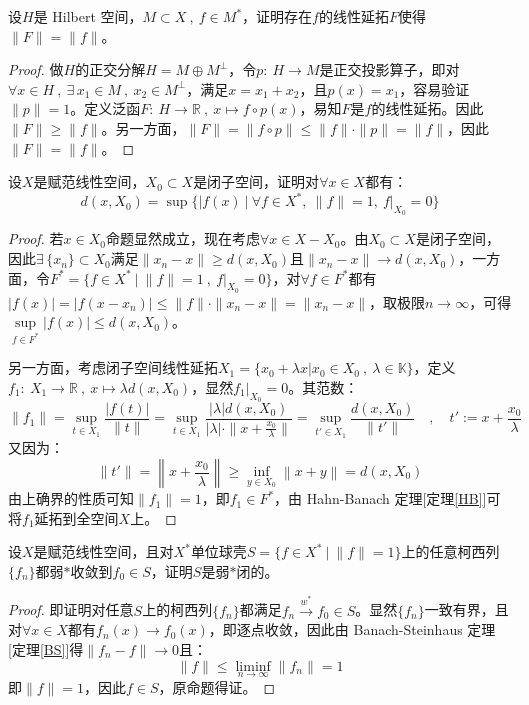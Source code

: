 \begin{example}
\quad 设$H$是 Hilbert 空间，$M \subset X \ , \ f \in M^*$，证明存在$f$的线性延拓$F$使得$\|F\|=\|f\|$。
\end{example}
\begin{proof}
做$H$的正交分解$H=M \oplus M^{\perp}$，令$p: \ H \to M$是正交投影算子，即对$\forall x \in H \ , \ \exists \, x_1 \in M \ , \ x_2 \in M^{\perp}$，满足$x=x_1+x_2$，且$p(x)=x_1$，容易验证$\|p\|=1$。定义泛函$F: \ H \to \mathbb{R} \ , \ x \mapsto f \circ p(x)$，易知$F$是$f$的线性延拓。因此$\|F\|\geq\|f\|$。另一方面，$\|F\|=\|f \circ p\| \leq \|f\| \cdot \|p\|=\|f\|$，因此$\|F\|=\|f\|$。
\end{proof}

\begin{example}
\quad 设$X$是赋范线性空间，$X_0 \subset X$是闭子空间，证明对$\forall x \in X$都有：
\[d(x,X_0)=\sup\{|f(x) \ | \ \forall f \in X^*, \ \|f\|=1, \ f|_{X_0}=0\}\]
\end{example}
\begin{proof}
若$x \in X_0$命题显然成立，现在考虑$\forall x \in X-X_0$。由$X_0 \subset X$是闭子空间，因此$\exists \, \{x_n\} \subset X_0$满足$\|x_n-x\| \geq d(x,X_0)$且$\|x_n-x\| \to d(x,X_0)$，一方面，令$F^*=\{f \in X^* \ | \ \|f\|=1 \ , \ f|_{X_0}=0\}$，对$\forall f \in F^*$都有$|f(x)|=|f(x-x_n)|\leq\|f\|\cdot\|x_n-x\|=\|x_n-x\|$，取极限$n \to \infty$，可得$\sup\limits_{f \in F^*}|f(x)|\leq d(x,X_0)$。

另一方面，考虑闭子空间线性延拓$X_1=\{x_0+\lambda x|x_0 \in X_0 \ , \ \lambda \in \mathbb{K}\}$，定义$f_1: \ X_1 \to \mathbb{R} \ , \ x \mapsto \lambda d(x,X_0)$，显然$f_1|_{X_0}=0$。其范数：
 \[\|f_1\|=\sup_{t \in X_1}\frac{|f(t)|}{\|t\|}=\sup_{t \in X_1}\frac{|\lambda|d(x,X_0)}{|\lambda|\cdot\|x+\frac{x_0}{\lambda}\|}=\sup_{t' \in X_1}\frac{d(x,X_0)}{\|t'\|} \quad , \quad t':=x+\frac{x_0}{\lambda}\]
 又因为：
 \[\|t'\|=\left\|x+\frac{x_0}{\lambda}\right\|\geq\inf_{y \in X_0}\left\|x+y\right\|=d(x,X_0)\]
 由上确界的性质可知$\|f_1\|=1$，即$f_1 \in F^*$，由 Hahn-Banach 定理[定理\ref{HB}]可将$f_1$延拓到全空间$X$上。
\end{proof}

\begin{example}
\quad 设$X$是赋范线性空间，且对$X^*$单位球壳$S=\{f \in X^* \ | \ \|f\|=1\}$上的任意柯西列$\{f_n\}$都弱$*$收敛到$f_0 \in S$，证明$S$是弱$*$闭的。
\end{example}
\begin{proof}
即证明对任意$S$上的柯西列$\{f_n\}$都满足$f_n \xrightarrow{w^*} f_0 \in S$。显然$\{f_n\}$一致有界，且对$\forall x \in X$都有$f_n(x) \to f_0(x)$，即逐点收敛，因此由 Banach-Steinhaus 定理[定理\ref{BS}]得$\|f_n-f\| \to 0$且：
\[\|f\|\leq \liminf_{n\to\infty}\|f_n\|=1\]
即$\|f\|=1$，因此$f \in S$，原命题得证。
\end{proof}

